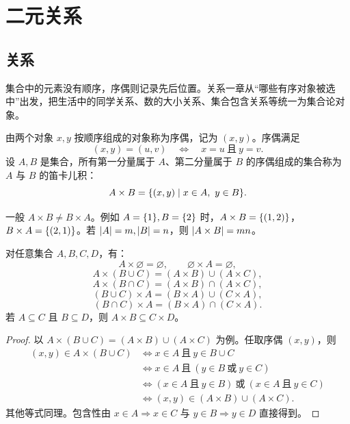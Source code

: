 %
%

\chapter{二元关系}

\section{关系}

集合中的元素没有顺序，序偶则记录先后位置。关系一章从“哪些有序对象被选中”出发，把生活中的同学关系、数的大小关系、集合包含关系等统一为集合论对象。

\begin{definition}[序偶与笛卡儿积]\label{ch2-ordered-product}
由两个对象 $x,y$ 按顺序组成的对象称为序偶，记为 $(x,y)$。序偶满足
\[
  (x,y)=(u,v)\quad\Longleftrightarrow\quad x=u\ \text{且}\ y=v.
\]
设 $A,B$ 是集合，所有第一分量属于 $A$、第二分量属于 $B$ 的序偶组成的集合称为 $A$ 与 $B$ 的笛卡儿积：
\[
  A\times B=\{(x,y)\mid x\in A,\ y\in B\}.
\]
\end{definition}

一般 $A\times B\ne B\times A$。例如 $A=\{1\},B=\{2\}$ 时，$A\times B=\{(1,2)\}$，$B\times A=\{(2,1)\}$。若 $\lvert A\rvert=m,\lvert B\rvert=n$，则 $\lvert A\times B\rvert=mn$。

\begin{theorem}[笛卡儿积的运算性质]\label{ch2-cartesian-laws}
对任意集合 $A,B,C,D$，有：
\[
A\times\varnothing=\varnothing,\qquad \varnothing\times A=\varnothing,
\]
\[
A\times(B\cup C)=(A\times B)\cup(A\times C),
\]
\[
A\times(B\cap C)=(A\times B)\cap(A\times C),
\]
\[
(B\cup C)\times A=(B\times A)\cup(C\times A),
\]
\[
(B\cap C)\times A=(B\times A)\cap(C\times A).
\]
若 $A\subseteq C$ 且 $B\subseteq D$，则 $A\times B\subseteq C\times D$。
\end{theorem}

\begin{proof}
以 $A\times(B\cup C)=(A\times B)\cup(A\times C)$ 为例。任取序偶 $(x,y)$，则
\[
\begin{aligned}
(x,y)\in A\times(B\cup C)
&\Longleftrightarrow x\in A\ \text{且}\ y\in B\cup C\\
&\Longleftrightarrow x\in A\ \text{且}\ (y\in B\ \text{或}\ y\in C)\\
&\Longleftrightarrow (x\in A\ \text{且}\ y\in B)\ \text{或}\ (x\in A\ \text{且}\ y\in C)\\
&\Longleftrightarrow (x,y)\in(A\times B)\cup(A\times C).
\end{aligned}
\]
其他等式同理。包含性由 $x\in A\Rightarrow x\in C$ 与 $y\in B\Rightarrow y\in D$ 直接得到。
\end{proof}

